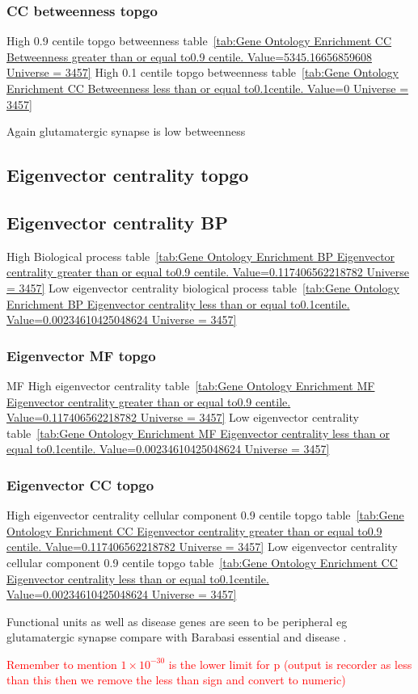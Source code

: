 \subsubsection{CC betweenness topgo}
High 0.9 centile topgo betweenness table~\ref{tab:Gene Ontology Enrichment CC Betweenness  greater than or equal to0.9 centile.   Value=5345.16656859608 Universe = 3457}
High 0.1 centile topgo betweenness table~\ref{tab:Gene Ontology Enrichment CC Betweenness  less than or equal to0.1centile.   Value=0 Universe = 3457}


Again glutamatergic synapse is low betweenness


\subsection{Eigenvector centrality topgo}
\subsection{Eigenvector centrality BP}
High Biological process table~\ref{tab:Gene Ontology Enrichment BP Eigenvector centrality  greater than or equal to0.9 centile.   Value=0.117406562218782 Universe = 3457}
Low eigenvector centrality biological process table~\ref{tab:Gene Ontology Enrichment BP Eigenvector centrality  less than or equal to0.1centile.   Value=0.00234610425048624 Universe = 3457}


\subsubsection{Eigenvector MF topgo}
MF
High eigenvector centrality table~\ref{tab:Gene Ontology Enrichment MF Eigenvector centrality  greater than or equal to0.9 centile.   Value=0.117406562218782 Universe = 3457} 
Low eigenvector centrality  table~\ref{tab:Gene Ontology Enrichment MF Eigenvector centrality  less than or equal to0.1centile.   Value=0.00234610425048624 Universe = 3457}


\subsubsection{Eigenvector CC topgo}
High eigenvector centrality cellular component 0.9 centile topgo table~\ref{tab:Gene Ontology Enrichment CC Eigenvector centrality  greater than or equal to0.9 centile.   Value=0.117406562218782 Universe = 3457}
Low eigenvector centrality cellular component 0.9 centile topgo table~\ref{tab:Gene Ontology Enrichment CC Eigenvector centrality  less than or equal to0.1centile.   Value=0.00234610425048624 Universe = 3457}

Functional units as well as disease genes are seen to be peripheral eg glutamatergic synapse compare with Barabasi essential and disease \cite{barabasi2011network}.

\textcolor{red}{Remember to mention $1 \times 10^{-30}$ is the lower limit for p (output is recorder as less than this then we remove the less than sign and convert to numeric)}

